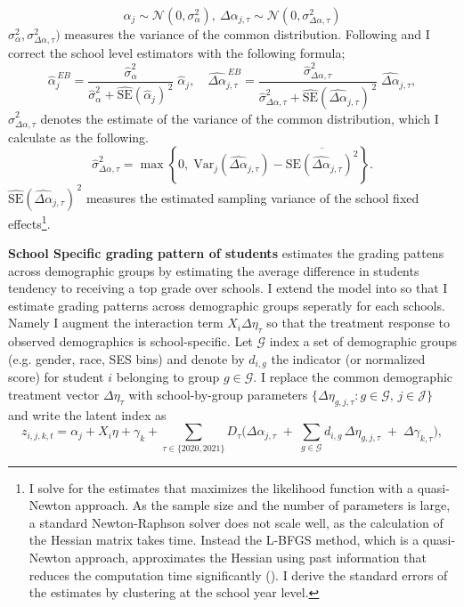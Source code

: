 \[\alpha_j \sim \mathcal{N}(0,\sigma_{\alpha}^2),\ \Delta\alpha_{j,\tau} \sim \mathcal{N}(0,\sigma_{\Delta\alpha,\tau}^2)\]
$\sigma_{\alpha}^2, \sigma_{\Delta\alpha,\tau}^2)$ measures the variance of the common distribution. Following \cite{b933f52e-83fe-34bb-bf19-f7f3e5459001} and \cite{10.1093/qje/qjab017} I correct the school level estimators with the following formula;
\[
\widehat{\alpha}^{\,EB}_j
=
\frac{\widehat{\sigma}^2_{\alpha}}
{\widehat{\sigma}^2_{\alpha} + \widehat{\mathrm{SE}}(\widehat{\alpha}_j)^{\,2}}
\;\widehat{\alpha}_j,
\quad
\widehat{\Delta\alpha}^{\,EB}_{j,\tau}
=
\frac{\widehat{\sigma}^2_{\Delta\alpha,\tau}}
{\widehat{\sigma}^2_{\Delta\alpha,\tau} + \widehat{\mathrm{SE}}(\widehat{\Delta\alpha}_{j,\tau})^{\,2}}
\;\widehat{\Delta\alpha}_{j,\tau},
\]
$\widehat{\sigma}^2_{\Delta\alpha,\tau}$ denotes the estimate of the variance of the common distribution, which I calculate as the following.
\[
\widehat{\sigma}^2_{\Delta\alpha,\tau}
=
\max\left\{
    0,\;
    \mathrm{Var}_j\!\left( \widehat{\Delta\alpha}_{j,\tau} \right)
    - \overline{\mathrm{SE}\!\left( \widehat{\Delta\alpha}_{j,\tau} \right)^{2}}
\right\}.
\]
$\widehat{\mathrm{SE}}(\widehat{\Delta\alpha}_{j,\tau})^{\,2}$ measures the estimated sampling variance of the school fixed effects\footnote{I solve for the estimates that maximizes the likelihood function with a quasi-Newton approach. As the sample size and the number of parameters is large, a standard Newton-Raphson solver does not scale well, as the calculation of the Hessian matrix takes time. Instead the L-BFGS method, which is a quasi-Newton approach, approximates the Hessian using past information that reduces the computation time significantly (\cite{GVK502988711}). I derive the standard errors of the estimates by clustering at the school year level. }. 


\noindent
\textbf{School Specific grading pattern of students}  estimates the grading pattens across demographic groups by estimating the average difference in students tendency to receiving a top grade over schools. I extend the model into  so that I estimate grading patterns across demographic groups seperatly for each schools. Namely I augment the interaction term $X_i\Delta\eta_{\tau}$ so that the treatment response to observed demographics is school-specific. Let $\mathcal{G}$ index a set of demographic groups (e.g. gender, race, SES bins) and denote by $d_{i,g}$ the indicator (or normalized score) for student $i$ belonging to group $g\in\mathcal{G}$. I replace the common demographic treatment vector $\Delta\eta_{\tau}$ with school-by-group parameters $\{\Delta\eta_{g,j,\tau}: g\in\mathcal{G},\, j\in\mathcal{J}\}$ and write the latent index as
\begin{equation}\label{eq:main_ext}
    z_{i,j,k,t}
=
\alpha_j
+ X_i \eta
+ \gamma_k
+ \sum_{\tau\in\{2020,2021\}} D_\tau
\Big(
    \Delta\alpha_{j,\tau}
    \;+\;
    \sum_{g\in\mathcal{G}} d_{i,g}\,\Delta\eta_{g,j,\tau}
    \;+\;
    \Delta\gamma_{k,\tau}
\Big),
\end{equation}

